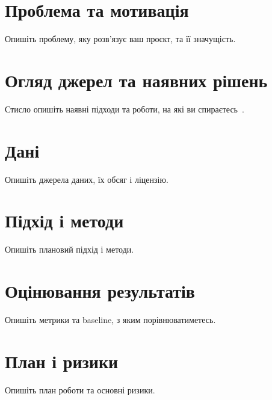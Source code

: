 \documentclass[ukrainian]{ucuproposal}
\begin{document}
\maketitlepage

\section{Проблема та мотивація}
Опишіть проблему, яку розв'язує ваш проєкт, та її значущість.

\section{Огляд джерел та наявних рішень}
Стисло опишіть наявні підходи та роботи, на які ви спираєтесь~\cite{example2023,example2022}.

\section{Дані}
Опишіть джерела даних, їх обсяг і ліцензію.

\section{Підхід і методи}
Опишіть плановий підхід і методи.

\section{Оцінювання результатів}
Опишіть метрики та baseline, з яким порівнюватиметесь.

\section{План і ризики}
Опишіть план роботи та основні ризики.

\end{document}
